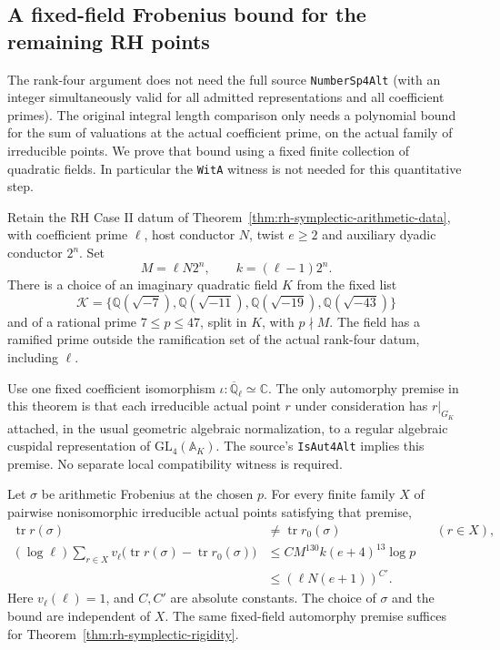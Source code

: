 \subsection{A fixed-field Frobenius bound for the remaining RH points}
\label{sec:rh-symplectic-spectrum}

The rank-four argument does not need the full source
\texttt{NumberSp4Alt} (with an integer simultaneously valid for
all admitted representations and all coefficient primes). The
original integral length comparison only needs a polynomial
bound for the sum of valuations at the actual coefficient prime,
on the actual family of irreducible points. We prove that
bound using a fixed finite collection of quadratic fields.
In particular the \texttt{WitA} witness is not needed for this
quantitative step.

\begin{theorem}
\label{thm:rh-symplectic-spectrum}
Retain the RH Case II datum of
Theorem~\ref{thm:rh-symplectic-arithmetic-data}, with coefficient
prime \(\ell\), host conductor \(N\), twist \(e\ge2\) and
auxiliary dyadic conductor \(2^n\). Set
\[
 M=\ell N2^n,\qquad k=(\ell-1)2^n.
\]
There is a choice of an imaginary quadratic field \(K\) from
the fixed list
\[
 \mathcal K=\{\mathbb Q(\sqrt{-7}),\mathbb Q(\sqrt{-11}),
             \mathbb Q(\sqrt{-19}),\mathbb Q(\sqrt{-43})\}
\]
and of a rational prime \(7\le p\le47\), split in \(K\), with
\(p\nmid M\). The field has a ramified prime outside the
ramification set of the actual rank-four datum, including \(\ell\).

Use one fixed coefficient isomorphism
\(\iota:\overline{\mathbb Q}_\ell\simeq\mathbb C\).
The only automorphy premise in this theorem is that each
irreducible actual point \(r\) under consideration has
\(r|_{G_K}\) attached, in the usual geometric algebraic
normalization, to a regular algebraic cuspidal representation
of \(\mathrm{GL}_4(\mathbb A_K)\). The source's
\texttt{IsAut4Alt} implies this premise. No separate
local compatibility witness is required.

Let \(\sigma\) be arithmetic Frobenius at the chosen \(p\).
For every finite family \(X\) of pairwise nonisomorphic
irreducible actual points satisfying that premise,
\[
 \begin{aligned}
  \operatorname{tr}r(\sigma)&\ne\operatorname{tr}r_0(\sigma)
                        &&(r\in X),\\
  (\log\ell)\sum_{r\in X}v_\ell\bigl(
        \operatorname{tr}r(\sigma)-\operatorname{tr}r_0(\sigma)\bigr)
       &\le C M^{130} k(e+4)^{13}\log p\\
       &\le (\ell N(e+1))^{C'} .
 \end{aligned}                                         \tag{FS4}
\]
Here \(v_\ell(\ell)=1\), and \(C,C'\) are absolute constants.
The choice of \(\sigma\) and the bound are independent of \(X\).
The same fixed-field automorphy premise suffices for
Theorem~\ref{thm:rh-symplectic-rigidity}.
\end{theorem}

